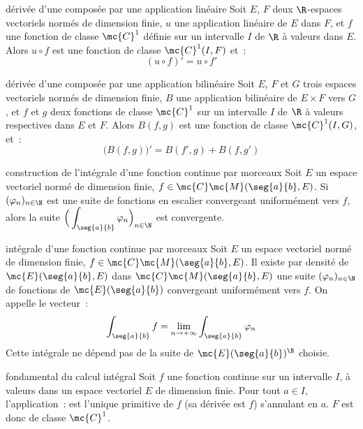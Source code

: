 

\begin{adjustwidth}{-3cm}{-3cm}


\begin{theoreme}{10.11}{dérivée d'une composée par une application linéaire}
    Soit $E$, $F$ deux $\R$-espaces vectoriels normés de dimension finie, $u$ une application linéaire de $E$ dans $F$, et $f$ une fonction de classe $\mc{C}^1$ définie sur un intervalle $I$ de $\R$ à valeurs dans $E$. Alors $u \circ f$ est une fonction de classe $\mc{C}^1(I,F)$ et~:
    $$(u\circ f)' = u \circ f'$$
\end{theoreme}

\begin{theoreme}{10.12}{dérivée d'une composée par une application bilinéaire}
    Soit $E$, $F$ et $G$ trois espaces vectoriels normés de dimension finie, $B$ une application bilinéaire de $E\times F$ vers $G$, et $f$ et $g$ deux fonctions de classe $\mc{C}^1$  sur un intervalle $I$ de $\R$ à valeurs respectives dans $E$ et $F$. Alors $B(f,g)$ est une fonction de classe $\mc{C}^1(I,G)$, et~:
    $$\Big(B(f,g)\Big)' = B(f',g) + B(f,g')$$
\end{theoreme}


\begin{theoreme}{10.29}{construction de l'intégrale d'une fonction continue par morceaux}
    Soit $E$ un espace vectoriel normé de dimension finie, $f \in \mc{C}\mc{M}(\seg{a}{b}, E)$. Si $(\varphi_n)_{n \in \N}$ est une suite de fonctions en escalier convergeant uniformément vers $f$, alors la suite $\displaystyle \Big( \int_{\seg{a}{b}} \varphi_n \Big)_{n \in \N}$ est convergente.
\end{theoreme}

\begin{definition}{10.30}{intégrale d'une fonction continue par morceaux}
    Soit $E$ un espace vectoriel normé de dimension finie, $f \in \mc{C}\mc{M}(\seg{a}{b}, E)$. Il existe par densité de $\mc{E}(\seg{a}{b}, E)$ dans $\mc{C}\mc{M}(\seg{a}{b}, E)$ une suite $(\varphi_n)_{n \in \N}$ de fonctions de $\mc{E}(\seg{a}{b})$ convergeant uniformément vers $f$. On appelle  le vecteur~:
    $$\int_{\seg{a}{b}} f = \lim_{n \to + \infty} \int_{\seg{a}{b}}\varphi_n$$
    Cette intégrale ne dépend pas de la suite de $\mc{E}(\seg{a}{b})^\N$ choisie.
\end{definition}

\begin{theoreme}{10.35}{fondamental du calcul intégral}
    Soit $f$ une fonction continue sur un intervalle $I$, à valeurs dans un espace vectoriel $E$ de dimension finie. Pour tout $a\in I$, l'application~:
    est l'unique primitive de $f$ (sa dérivée est $f$) s'annulant en $a$. $F$ est donc de classe $\mc{C}^1$.
\end{theoreme}


\end{adjustwidth}
